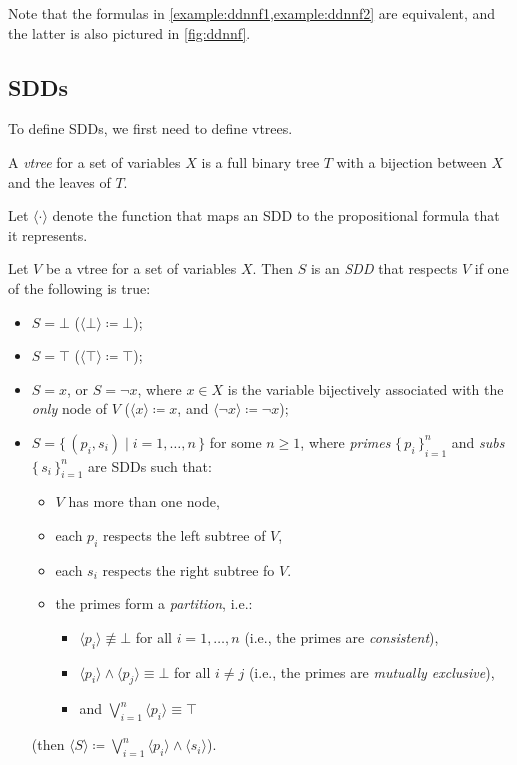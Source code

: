 Note that the formulas in \cref{example:ddnnf1,example:ddnnf2} are equivalent,
and the latter is also pictured in \cref{fig:ddnnf}.

\subsection{SDDs}\label{sec:sdds}

To define SDDs, we first need to define vtrees.

\begin{definition}
  A \emph{vtree} for a set of variables $X$ is a full binary tree $T$ with a
  bijection between $X$ and the leaves of $T$.
\end{definition}

Let $\langle\cdot\rangle$ denote the function that maps an SDD to the
propositional formula that it represents.

\begin{definition}
  Let $V$ be a vtree for a set of variables $X$. Then $S$ is an \emph{SDD} that
  respects $V$ if one of the following is true:
  \begin{itemize}
    \item $S = \bot$ ($\langle \bot \rangle \coloneqq \bot$);
    \item $S = \top$ ($\langle \top \rangle \coloneqq \top$);
    \item $S = x$, or $S = \neg x$, where $x \in X$ is the variable bijectively
          associated with the \emph{only} node of $V$
          ($\langle x \rangle \coloneqq x$, and
          $\langle \neg x \rangle \coloneqq \neg x$);
    \item $S = \{\, (p_i, s_i) \mid i = 1, \dots, n \,\}$ for some $n \ge 1$,
          where \emph{primes} ${\{\,p_i\,\}}_{i=1}^n$ and \emph{subs}
          ${\{\,s_i\,\}}_{i=1}^n$ are SDDs such that:
    \begin{itemize}
      \item $V$ has more than one node,
      \item each $p_i$ respects the left subtree of $V$,
      \item each $s_i$ respects the right subtree fo $V$.
      \item the primes form a \emph{partition}, i.e.:
      \begin{itemize}
        \item $\langle p_i \rangle \not\equiv \bot$ for all $i = 1, \dots, n$
              (i.e., the primes are \emph{consistent}),
        \item $\langle p_i \rangle \land \langle p_j \rangle \equiv \bot$ for
              all $i \ne j$ (i.e., the primes are \emph{mutually exclusive}),
        \item and $\bigvee_{i=1}^n \langle p_i \rangle \equiv \top$
      \end{itemize}
    \end{itemize}
    (then $\langle S \rangle \coloneqq \bigvee_{i=1}^n \langle p_i \rangle \land \langle s_i \rangle$).
  \end{itemize}
\end{definition}

